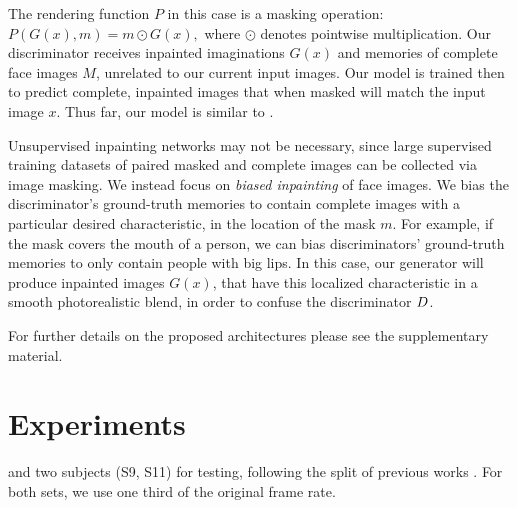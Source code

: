 \documentclass[10pt,twocolumn,letterpaper]{article}
\newcommand\todo[1]{\textcolor{red}{#1}}
\begin{document}
\begin{bibunit}[ieee]
The rendering function  $P$ in this case is 
a masking operation: $P(G(x),m) = m \odot G(x),$ where $\odot$ denotes pointwise multiplication. Our discriminator receives inpainted imaginations $G(x)$ and memories of complete face images $M$, unrelated to our current input images. Our model is trained then to predict complete, inpainted  images that when masked will match the input image $x$. Thus far, our model is similar to  \cite{DBLP:journals/corr/YehCLHD16}.

Unsupervised inpainting networks \cite{DBLP:journals/corr/YehCLHD16}  may not be necessary, since large  supervised training datasets of paired masked and complete images can be  collected via image masking.     
We instead focus on \textit{biased inpainting} of face images.  
We bias the discriminator's ground-truth memories to contain complete images with a  particular desired characteristic, in the location of the mask $m$. For example, if the mask covers the mouth of a person, we  can bias discriminators' ground-truth memories  to only contain people with big lips. In this case, our generator will produce inpainted  images $G(x)$, that have this localized characteristic in a smooth photorealistic blend, in order to confuse the discriminator $D$.

For further details on the proposed architectures please see the supplementary material.
\section{Experiments}%
and two subjects (S9, S11) for testing, following the split of previous works  \cite{DBLP:journals/corr/ZhouZPLDD17}.
For both sets, we use one third of the original frame rate.


\end{bibunit}
\end{document}
